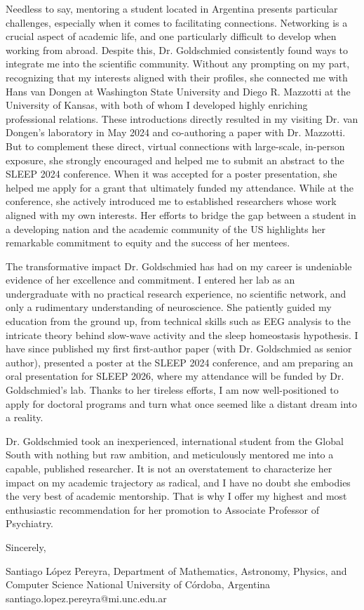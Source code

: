 \documentclass[a4paper, 12pt]{article}
\begin{document}
Needless to say, mentoring a student located in Argentina presents particular
challenges, especially when it comes to facilitating connections. Networking is
a crucial aspect of academic life, and one particularly difficult to develop when working
from abroad. Despite this, Dr. Goldschmied consistently found ways to integrate
me into the scientific community. Without any prompting on my part, recognizing
that my interests aligned with their profiles, she connected me with Hans van
Dongen at Washington State University and Diego R. Mazzotti  at the University
of Kansas, with both of whom I developed highly enriching professional
relations. These introductions directly resulted in my visiting Dr.
van Dongen's laboratory in May 2024 and co-authoring a paper with Dr. Mazzotti.
But to complement these direct, virtual connections with large-scale, in-person
exposure, she strongly encouraged and helped me to submit an abstract to the SLEEP 2024
conference. When it was accepted for a poster presentation, she helped me apply
for a grant that ultimately funded my attendance. While at the conference, she
actively introduced me to established researchers whose work aligned with my own
interests. Her efforts to bridge the gap between a student in a developing
nation and the academic community of the US highlights her remarkable commitment
to equity and the success of her mentees.

The transformative impact Dr. Goldschmied has had on my career is undeniable evidence of
her excellence and commitment. I entered her lab as an undergraduate
with no practical research experience, no scientific network, and only a
rudimentary understanding of neuroscience. She patiently guided my education
from the ground up, from technical skills such as EEG analysis to the intricate
theory behind slow-wave activity and the sleep homeostasis hypothesis. I have
since published my first first-author paper (with Dr. Goldschmied as senior
author), presented a poster at the SLEEP 2024 conference, and am preparing an
oral presentation for SLEEP 2026, where my attendance will be funded by Dr.
Goldschmied's lab. Thanks to her tireless efforts, I am now well-positioned to
apply for doctoral programs and turn what once seemed like a distant dream into
a reality.



Dr. Goldschmied took an inexperienced, international student from the Global
South with nothing but raw ambition, and meticulously mentored me into a
capable, published researcher. It is not an overstatement to characterize her
impact on my academic trajectory as radical, and I have no doubt she embodies
the very best of academic mentorship. That is why I offer my highest and most
enthusiastic recommendation for her promotion to Associate Professor of
Psychiatry.

Sincerely,

Santiago López Pereyra,\newline
Department of Mathematics, Astronomy, Physics, and Computer Science\newline
National University of Córdoba, Argentina\newline
santiago.lopez.pereyra@mi.unc.edu.ar
\end{document}
